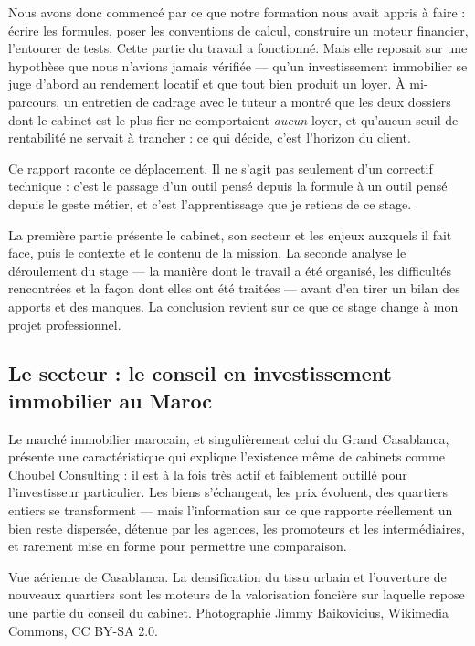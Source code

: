 \documentclass[12pt,a4paper]{article}
\newcommand{\entreprise}{Choubel Consulting}
\begin{document}
Nous avons donc commencé par ce que notre formation nous avait appris à faire :
écrire les formules, poser les conventions de calcul, construire un moteur
financier, l'entourer de tests. Cette partie du travail a fonctionné. Mais elle
reposait sur une hypothèse que nous n'avions jamais vérifiée --- qu'un
investissement immobilier se juge d'abord au rendement locatif et que tout bien
produit un loyer. À mi-parcours, un entretien de cadrage avec le tuteur a montré
que les deux dossiers dont le cabinet est le plus fier ne comportaient
\emph{aucun} loyer, et qu'aucun seuil de rentabilité ne servait à trancher : ce
qui décide, c'est l'horizon du client.

Ce rapport raconte ce déplacement. Il ne s'agit pas seulement d'un correctif
technique : c'est le passage d'un outil pensé depuis la formule à un outil pensé
depuis le geste métier, et c'est l'apprentissage que je retiens de ce stage.

La première partie présente le cabinet, son secteur et les enjeux auxquels il
fait face, puis le contexte et le contenu de la mission. La seconde analyse le
déroulement du stage --- la manière dont le travail a été organisé, les
difficultés rencontrées et la façon dont elles ont été traitées --- avant
d'en tirer un bilan des apports et des manques. La conclusion revient sur ce que
ce stage change à mon projet professionnel.


\subsection{Le secteur : le conseil en investissement immobilier au Maroc}

Le marché immobilier marocain, et singulièrement celui du Grand Casablanca,
présente une caractéristique qui explique l'existence même de cabinets comme
\entreprise{} : il est à la fois très actif et faiblement outillé pour
l'investisseur particulier. Les biens s'échangent, les prix évoluent, des
quartiers entiers se transforment --- mais l'information sur ce que rapporte
réellement un bien reste dispersée, détenue par les agences, les promoteurs et
les intermédiaires, et rarement mise en forme pour permettre une comparaison.

{Vue aérienne de Casablanca. La densification du tissu urbain et l'ouverture de
	nouveaux quartiers sont les moteurs de la valorisation foncière sur laquelle
	repose une partie du conseil du cabinet.}
{Photographie Jimmy Baikovicius, Wikimedia Commons, CC BY-SA 2.0.}
\end{document}
